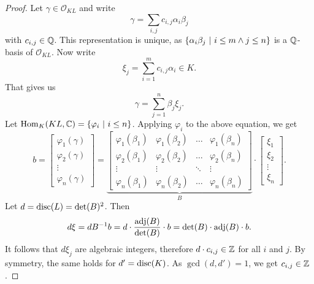 \begin{proof}
Let $\gamma \in \mathcal{O}_{KL}$ and write
\[
\gamma = \sum_{i,j} c_{i,j} \alpha_i \beta_j
\]
with $c_{i,j} \in \mathbb{Q}$. This representation is unique, as
$\left\{\alpha_i \beta_j~\middle\vert~i \leq m \land j \leq n\right\}$ is a $\mathbb{Q}$-basis
of $\mathcal{O}_{KL}$. Now write
\[
\xi_j = \sum_{i=1}^m c_{i,j} \alpha_i \in K.
\]
That gives us
\[
\gamma = \sum_{j=1}^n \beta_j \xi_j.
\]
Let $\operatorname{Hom}_K(KL, \mathbb{C}) = \left\{\varphi_i~\middle\vert~i \leq n\right\}$. Applying
$\varphi_i$ to the above equation, we get
\[
b =
\begin{bmatrix}
\varphi_1(\gamma) \\
\varphi_2(\gamma) \\
\vdots \\
\varphi_n(\gamma)
\end{bmatrix}
=
\underbrace{\begin{bmatrix}
\varphi_1(\beta_1) & \varphi_1(\beta_2) &
\dots & \varphi_1(\beta_n) \\
\varphi_2(\beta_1) & \varphi_2(\beta_2) &
\dots & \varphi_2(\beta_n) \\
\vdots & \vdots & \ddots & \vdots \\
\varphi_n(\beta_1) & \varphi_n(\beta_2) &
\dots & \varphi_n(\beta_n)
\end{bmatrix}}_B
\cdot
\begin{bmatrix}
\xi_1 \\ \xi_2 \\ \vdots \\ \xi_n
\end{bmatrix}.
\]
Let $d = \operatorname{disc}(L) = \det(B)^2$. Then
\[
d \xi =
d B^{-1} b =
d \cdot \frac{\operatorname{adj}(B)}{\det(B)} \cdot b =
\det(B) \cdot \operatorname{adj}(B) \cdot b.
\]
It follows that $d \xi_j$ are algebraic integers, therefore
$d \cdot c_{i,j} \in \mathbb{Z}$ for all $i$ and $j$. By symmetry, the same
holds for $d' = \operatorname{disc}(K)$. As $\gcd(d, d') = 1$, we get
$c_{i,j} \in \mathbb{Z}$.


\end{proof}
